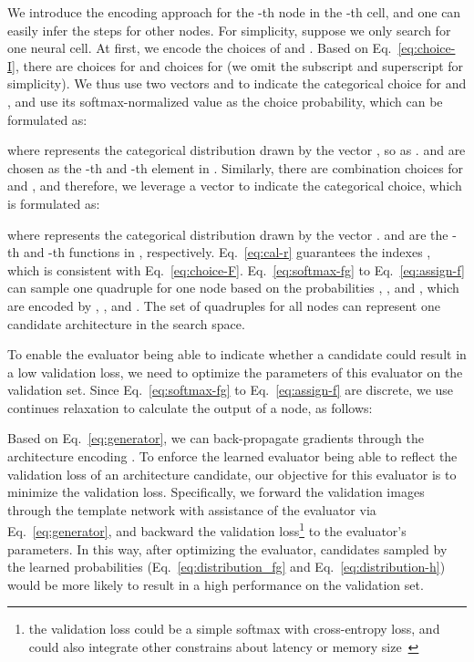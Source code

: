 \documentclass[10pt,twocolumn,letterpaper]{article}
\def\Eqref#1{{Eq.~\eqref{#1}}}
\begin{document}
We introduce the encoding approach for the -th node in the -th cell, and one can easily infer the steps for other nodes. For simplicity, suppose we only search for one neural cell.
At first, we encode the choices of  and . Based on \Eqref{eq:choice-I}, there are  choices for  and  choices for  (we omit the subscript and superscript for simplicity). We thus use two vectors  and  to indicate the categorical choice for  and , and use its softmax-normalized value as the choice probability, which can be formulated as:
{\small

}\noindent where  represents the categorical distribution drawn by the vector , so as .
 and  are chosen as the -th and -th element in .
Similarly, there are  combination choices for  and , and therefore, we leverage a vector  to indicate the categorical choice, which is formulated as:
{\small

}\noindent where  represents the categorical distribution drawn by the vector .  and  are the -th and -th functions in , respectively. \Eqref{eq:cal-r} guarantees the indexes , which is consistent with \Eqref{eq:choice-F}.
\Eqref{eq:softmax-fg} to \Eqref{eq:assign-f} can sample one quadruple  for one node based on the probabilities , , and , which are encoded by , , and .
The set of quadruples for all nodes  can represent one candidate architecture in the search space.



To enable the evaluator being able to indicate whether a candidate could result in a low validation loss, we need to optimize the parameters of this evaluator  on the validation set.
Since \Eqref{eq:softmax-fg} to \Eqref{eq:assign-f} are discrete, we use continues relaxation to calculate the output  of a node, as follows:
{\small

}
\noindent Based on \Eqref{eq:generator}, we can back-propagate gradients through the architecture encoding . To enforce the learned evaluator being able to reflect the validation loss of an architecture candidate, our objective for this evaluator is to minimize the validation loss.
Specifically, we forward the validation images through the template network with assistance of the evaluator via \Eqref{eq:generator}, and backward the validation loss\footnote{the validation loss could be a simple softmax with cross-entropy loss, and could also integrate other constrains about latency or memory size~\cite{cai2019proxylessnas}} to the evaluator's parameters.
In this way, after optimizing the evaluator, candidates sampled by the learned probabilities (\Eqref{eq:distribution_fg} and \Eqref{eq:distribution-h}) would be more likely to result in a high performance on the validation set.
\end{document}
